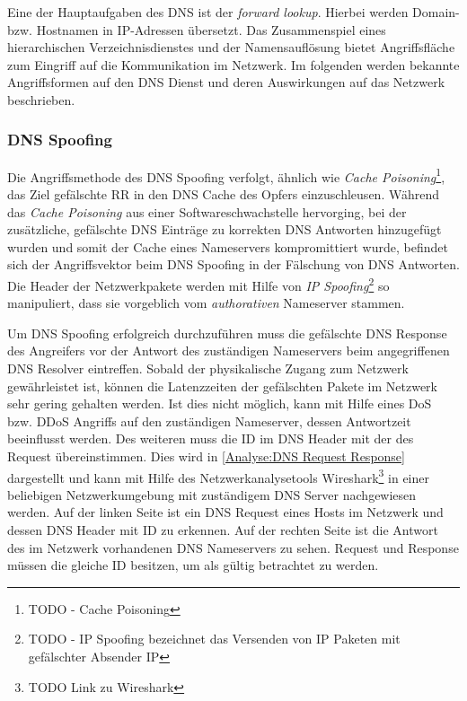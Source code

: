 Eine der Hauptaufgaben des \ac{DNS} ist der \textit{forward lookup}. Hierbei werden Domain- bzw. Hostnamen in \ac{IP}-Adressen übersetzt. Das Zusammenspiel eines hierarchischen Verzeichnisdienstes und der Namensauflösung bietet Angriffsfläche zum Eingriff auf die Kommunikation im Netzwerk. Im folgenden werden bekannte Angriffsformen auf den \ac{DNS} Dienst und deren Auswirkungen auf das Netzwerk beschrieben.

\subsubsection{\ac{DNS} Spoofing}
Die Angriffsmethode des \ac{DNS} Spoofing verfolgt, ähnlich wie \textit{Cache Poisoning}\footnote{TODO - Cache Poisoning}, das Ziel gefälschte \ac{RR} in den \ac{DNS} Cache des Opfers einzuschleusen. Während das \textit{Cache Poisoning} aus einer Softwareschwachstelle hervorging, bei der zusätzliche, gefälschte \ac{DNS} Einträge zu korrekten \ac{DNS} Antworten hinzugefügt wurden und somit der Cache eines Nameservers kompromittiert wurde, befindet sich der Angriffsvektor beim \ac{DNS} Spoofing in der Fälschung von \ac{DNS} Antworten. Die Header der Netzwerkpakete werden mit Hilfe von \textit{IP Spoofing}\footnote{TODO - IP Spoofing bezeichnet das Versenden von IP Paketen mit gefälschter Absender IP} so manipuliert, dass sie vorgeblich vom \textit{authorativen} Nameserver stammen. 

Um \ac{DNS} Spoofing erfolgreich durchzuführen muss die gefälschte \ac{DNS} Response des Angreifers vor der Antwort des zuständigen Nameservers beim angegriffenen \ac{DNS} Resolver eintreffen. Sobald der physikalische Zugang zum Netzwerk gewährleistet ist, können die Latenzzeiten der gefälschten Pakete im Netzwerk sehr gering gehalten werden. Ist dies nicht möglich, kann mit Hilfe eines \ac{DoS} bzw. \ac{DDoS} Angriffs auf den zuständigen Nameserver, dessen Antwortzeit beeinflusst werden. Des weiteren muss die ID im \ac{DNS} Header mit der des Request übereinstimmen. Dies wird in \autoref{Analyse:DNS Request Response} dargestellt und kann mit Hilfe des Netzwerkanalysetools Wireshark\footnote{TODO Link zu Wireshark} in einer beliebigen Netzwerkumgebung mit zuständigem \ac{DNS} Server nachgewiesen werden. Auf der linken Seite ist ein DNS Request eines Hosts im Netzwerk und dessen \ac{DNS} Header mit ID zu erkennen. Auf der rechten Seite ist die Antwort des im Netzwerk vorhandenen \ac{DNS} Nameservers zu sehen. Request und Response müssen die gleiche ID besitzen, um als gültig betrachtet zu werden.

